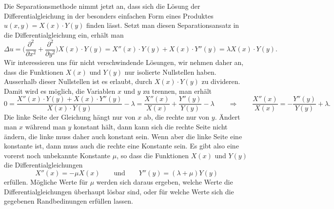 Die Separationsmethode nimmt jetzt an, dass sich die Lösung der
Differentialgleichung in der besonders einfachen Form eines Produktes
$u(x,y)=X(x)\cdot Y(y)$ finden lässt.
Setzt man diesen Separationsansatz
in die Differentialgleichung ein, erhält man
\[
\Delta u
=
\biggl(
\frac{\partial^2}{\partial x^2}
+
\frac{\partial^2}{\partial y^2}
\biggr)
X(x)\cdot Y(y)
=
X''(x)\cdot Y(y) + X(x)\cdot Y''(y)
=
\lambda X(x)\cdot Y(y).
\]
Wir interessieren uns für nicht verschwindende Lösungen, wir nehmen daher
an, dass die Funktionen $X(x)$ und $Y(y)$ nur isolierte Nullstellen haben.
Ausserhalb dieser Nullstellen ist es erlaubt, durch $X(x)\cdot Y(y)$ zu
divideren. 
Damit wird es möglich, die Variablen $x$ und $y$ zu trennen, man
erhält
\[
0
=
\frac{X''(x)\cdot Y(y) + X(x)\cdot Y''(y)}{X(x)\cdot Y(y)} - \lambda
=
\frac{X''(x)}{X(x)}
+
\frac{Y''(y)}{Y(y)}
-
\lambda
\qquad\Rightarrow\qquad
\frac{X''(x)}{X(x)}=-\frac{Y''(y)}{Y(y)}+\lambda.
\]
Die linke Seite der Gleichung hängt nur von $x$ ab, die rechte nur von $y$.
Ändert man $x$ während man $y$ konstant hält, dann kann sich die rechte
Seite nicht ändern, die linke muss daher auch konstant sein.
Wenn aber die linke Seite eine konstante ist, dann muss auch die rechte
eine Konstante sein. 
Es gibt also eine vorerst noch unbekannte Konstante $\mu$, so dass
die Funktionen $X(x)$ und $Y(y)$ die Differentialgleichungen
\begin{equation}
X''(x) = -\mu X(x)
\qquad\text{und}\qquad
Y''(y) = (\lambda+\mu)Y(y)
\label{skript:separation:gleichungen}
\end{equation}
erfüllen.
Mögliche Werte für $\mu$ werden sich daraus ergeben, welche Werte die
Differentialgleichungen überhaupt lösbar sind, oder für welche Werte
sich die gegebenen Randbedinungen erfüllen lassen.

